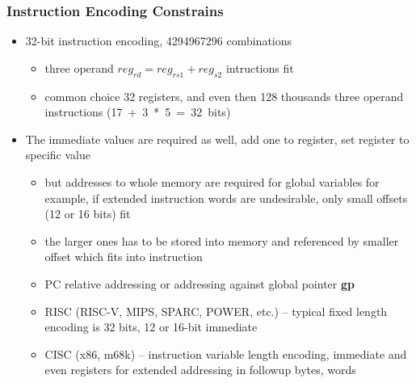 \documentclass{beamer}
\begin{document}
\begin{frame}
\frametitle{Instruction Encoding Constrains}

\begin{itemize}

\item 32-bit instruction encoding, 4294967296 combinations
\begin{itemize}
\item three operand \texttt{$reg_{rd} = reg_{rs1} + reg_{s2}$} intructions fit
\item common choice 32 registers, and even then 128 thousands three operand instructions (17~+~3~*~5~=~32~bits)
\end{itemize}
\item The immediate values are required as well, add one to register, set register to specific value
\begin{itemize}
\item but addresses to whole memory are required for global variables for example, if extended instruction words are undesirable, only small offsets (12 or 16 bits) fit
\item the larger ones has to be stored into memory and referenced by smaller offset which fits into instruction
\item PC relative addressing or addressing against global pointer \textbf{gp}
\item RISC (RISC-V, MIPS, SPARC, POWER, etc.) --  typical fixed length encoding is 32 bits, 12 or 16-bit immediate
\item CISC (x86, m68k) -- instruction variable length encoding, immediate and even registers for extended addressing in followup bytes, words
\end{itemize}
\end{itemize}
\end{frame}
\end{document}
